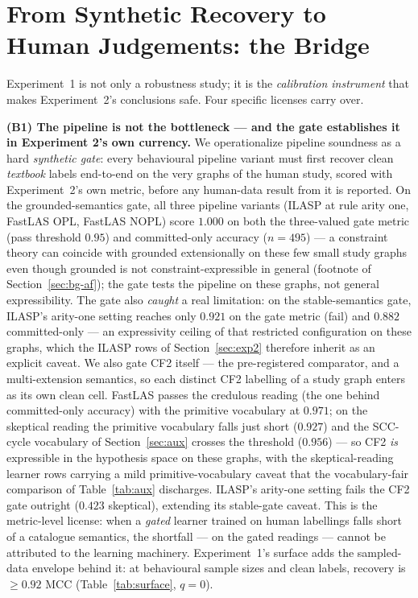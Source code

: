 \documentclass[review,12pt]{elsarticle}
\theoremstyle{definition}
\theoremstyle{remark}
\begin{document}
\section{From Synthetic Recovery to Human Judgements: the Bridge}
\label{sec:bridge}

Experiment~1 is not only a robustness study; it is the \emph{calibration
instrument} that makes Experiment~2's conclusions safe. Four specific licenses
carry over.

\textbf{(B1) The pipeline is not the bottleneck --- and the gate establishes it in
Experiment 2's own currency.} We operationalize pipeline soundness as a hard
\emph{synthetic gate}: every behavioural pipeline variant must first recover
clean \emph{textbook} labels end-to-end on the very graphs of the human study,
scored with Experiment~2's own metric, before any human-data result from it is
reported. On the grounded-semantics gate, all three pipeline variants (ILASP
at rule arity one, FastLAS OPL, FastLAS NOPL) score $1.000$ on both the
three-valued gate metric (pass threshold $0.95$) and committed-only accuracy
($n=495$) --- a constraint theory can coincide with grounded extensionally on
these few small study graphs even though grounded is not
constraint-expressible in general (footnote of Section~\ref{sec:bg-af}); the
gate tests the pipeline on these graphs, not general expressibility. The gate also \emph{caught} a real limitation: on the
stable-semantics gate, ILASP's arity-one setting reaches only $0.921$ on the
gate metric (fail) and $0.882$ committed-only --- an expressivity ceiling of
that restricted
configuration on these graphs, which the ILASP rows of
Section~\ref{sec:exp2} therefore inherit as an explicit caveat. We also gate
CF2 itself --- the pre-registered comparator, and a multi-extension semantics,
so each distinct CF2 labelling of a study graph enters as its own clean cell.
FastLAS passes the credulous reading (the one behind committed-only accuracy)
with the primitive vocabulary at $0.971$; on the skeptical reading the
primitive vocabulary falls just short ($0.927$) and the SCC-cycle vocabulary
of Section~\ref{sec:aux} crosses the threshold ($0.956$) --- so CF2 \emph{is}
expressible in the hypothesis space on these graphs, with the skeptical-reading
learner rows carrying a mild primitive-vocabulary caveat that the
vocabulary-fair comparison of Table~\ref{tab:aux} discharges. ILASP's
arity-one setting fails the CF2 gate outright ($0.423$ skeptical), extending
its stable-gate caveat. This is the
metric-level license: when a \emph{gated} learner trained on human labellings
falls short of a catalogue semantics, the shortfall --- on the gated readings
--- cannot be attributed to the
learning machinery. Experiment~1's surface adds the sampled-data envelope
behind it: at behavioural sample sizes and clean labels, recovery is
$\ge0.92$ MCC (Table~\ref{tab:surface}, $q=0$).
\end{document}
